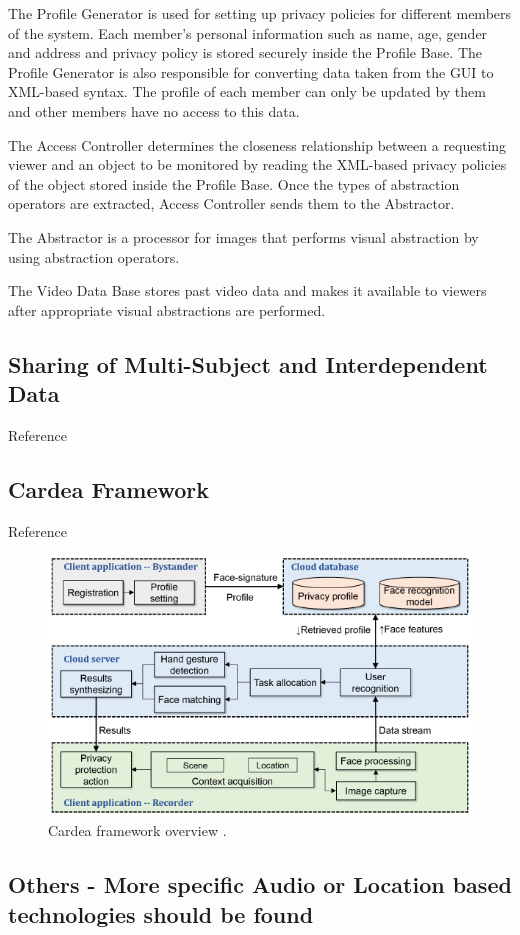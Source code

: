 \documentclass[conference]{IEEEtran}
\begin{document}
The Profile Generator is used for setting up privacy policies for different members of the system. Each member's personal information such as name, age, gender and address and privacy policy is stored securely inside the Profile Base. The Profile Generator is also responsible for converting data taken from the GUI to \ac{XML}-based syntax. The profile of each member can only be updated by them and other members have no access to this data. 

The Access Controller determines the closeness relationship between a requesting viewer and an object to be monitored by reading the \ac{XML}-based privacy policies of the object stored inside the Profile Base. Once the types of abstraction operators are extracted, Access Controller sends them to the Abstractor. 

The Abstractor is a processor for images that performs visual abstraction by using abstraction operators. 

The Video Data Base stores past video data and makes it available to viewers after appropriate visual abstractions are performed. 



\subsection{Sharing of Multi-Subject and Interdependent Data}
Reference \cite{olteanu2018consensual}

\subsection{Cardea Framework}
Reference \cite{shu2016cardea}

\begin{figure}[t]
\centerline{\includegraphics[width=.5\textwidth]{img/cardea_overview_diagram.png}}
\caption{Cardea framework overview \cite{shu2016cardea}.}
\label{fig:cardea}
\end{figure}

\subsection{Others - More specific Audio or Location based technologies should be found}
\end{document}
